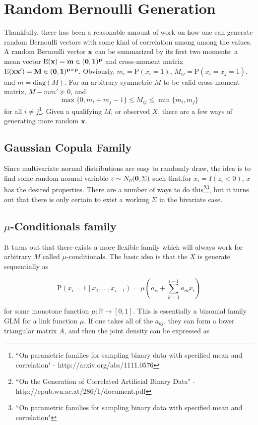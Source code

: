 \documentclass[11pt]{article}
\newcommand{\R}{\mathbb{R}}
\newcommand{\p}{\mathrm{P}}
\newcommand{\E}{\mathrm{E}}
\newcommand{\diag}{\mathrm{diag}}
\newcommand{\st}{ \; \big | \:}
\theoremstyle{definition}
\begin{document}
\section{Random Bernoulli Generation}
Thankfully, there has been a reasonable amount of work on how one can generate random Bernoulli vectors with some kind of correlation among among the values. A random Bernoulli vector $\bf x$ can be summarized by its first two moments: a mean vector $\E(\bf x)=m\in(0,1)^p$ and cross-moment matrix $\E(\bf x\bf x')=M\in(0,1)^{p\times p}$. Obviously, $m_i = \p(x_i=1)$, $M_{ij} = \p(x_i=x_j=1)$, and $m=\diag(M)$. For an arbitrary symmetric $M$ to be valid cross-moment matrix, $M-mm'\succeq0$, and
\[ \max\{0,m_i+m_j -1\} \leq M_{ij} \leq \min\{m_i,m_j\}\]
for all $i\neq j$\footnote{``On parametric families for sampling binary data with specified mean and correlation" - http://arxiv.org/abs/1111.0576}. Given a qualifying $M$, or observed $X$, there are a few ways of generating more random $\bf x$.

\subsection{Gaussian Copula Family}
Since multivariate normal distributions are easy to randomly draw, the idea is to find some random normal variable $z\sim N_p({\bf 0},\Sigma)$ such that,for $x_i = I(z_i<0)$, $x$ has the desired properties. There are a number of ways to do this\footnote{``On the Generation of Correlated Artificial Binary Data" - http://epub.wu.ac.at/286/1/document.pdf}\footnote{``On parametric families for sampling binary data with specified mean and correlation"}, but it turns out that there is only certain to exist a working $\Sigma$ in the bivariate case. 

\subsection{$\mu$-Conditionals family}
It turns out that there exists a more flexible family which will always work for arbitrary $M$ called $\mu$-conditionals. The basic idea is that the $X$ is generate sequentially as 

\[ \p(x_{i}=1\st x_{1},...,x_{i-1}) = \mu\left(a_{ii}+\sum_{k=1}^{i-1}a_{ik}x_i\right) \]

for some monotone function $\mu:\R\to[0,1]$. This is essentially a binomial family GLM for a link function $\mu$. If one takes all of the $a_{kj}$, they can form a lower triangular matrix $A$, and then the joint density can be expressed as 
\end{document}
